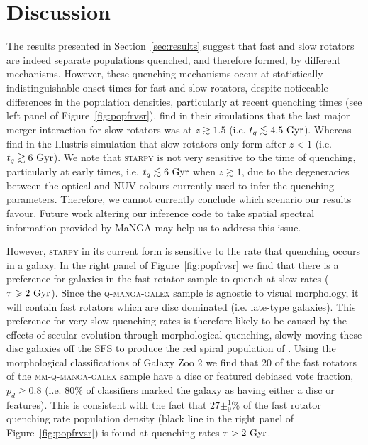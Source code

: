 \documentclass[useAMS,usenatbib]{mn2e}
\def\lesssim{\mathrel{\hbox{\rlap{\hbox{\lower3pt\hbox{$\sim$}}}\hbox{\raise2pt\hbox{$<$}}}}}
\begin{document}
\section{Discussion}\label{sec:discussion}

The results presented in Section~\ref{sec:results} suggest that fast and slow rotators are indeed separate populations quenched, and therefore formed, by different mechanisms. However, these quenching mechanisms occur at statistically indistinguishable onset times for fast and slow rotators, despite noticeable differences in the population densities, particularly at recent quenching times (see left panel of Figure~\ref{fig:popfrvsr}). \cite{khochfar11} find in their simulations that the last major merger interaction for slow rotators was at $z \gtrsim 1.5$ (i.e. $t_q \lesssim 4.5~\rm{Gyr}$). Whereas \cite{penoyre17}  find in the Illustris simulation that slow rotators only form after $z < 1$ (i.e. $t_q \gtrsim 6~\rm{Gyr}$). We note that \textsc{starpy} is not very sensitive to the time of quenching, particularly at early times, i.e. $t_q \lesssim 6~\rm{Gyr}$ when $z \gtrsim 1$, due to the degeneracies between the optical and NUV colours currently used to infer the quenching parameters. Therefore, we cannot currently conclude which scenario our results favour. Future work altering our inference code to take spatial spectral information provided by MaNGA may help us to address this issue.

However, \textsc{starpy} in its current form is sensitive to the rate that quenching occurs in a galaxy. In the right panel of Figure~\ref{fig:popfrvsr} we find that there is a preference for galaxies in the fast rotator sample to quench at slow rates ($\tau \geq 2~\rm{Gyr}$). Since the \textsc{q-manga-galex} sample is agnostic to visual morphology, it will contain fast rotators which are disc dominated (i.e. late-type galaxies). This preference for very slow quenching rates is therefore likely to be caused by the effects of secular evolution through morphological quenching, slowly moving these disc galaxies off the SFS to produce the red spiral population of \cite{masters12a}. Using the morphological classifications of Galaxy Zoo 2 \citep[GZ2][]{lintott11, GZ2} we find that $20$ of the fast rotators of the \textsc{mm-q-manga-galex} sample have a disc or featured debiased vote fraction, $p_d \geq 0.8$ (i.e. $80\%$ of classifiers marked the galaxy as having either a disc or features). This is consistent with the fact that $27\pm^{1}_{9}\%$ of the fast rotator quenching rate population density (black line in the right panel of Figure~\ref{fig:popfrvsr}) is found at quenching rates $\tau > 2~\rm{Gyr}$. 
\end{document}

